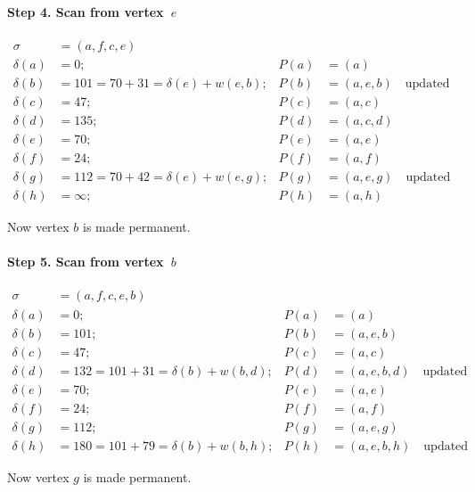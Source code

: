 \documentclass[10pt,]{book}
\theoremstyle{plain}
\theoremstyle{definition}
\theoremstyle{definition}
\theoremstyle{definition}
\theoremstyle{definition}
\numberwithin{equation}{section}
\newcommand{\amp}{&}
\begin{document}
\paragraph[{Step 4.  Scan from vertex~\(e\)}]{Step 4.  Scan from vertex~\(e\)}\hypertarget{paragraphs-4}{}
\hypertarget{p-205}{}%
%
\begin{align*}
\sigma\amp=(a,f,c,e)\\
\delta(a)\amp=0; \amp P(a)\amp=(a)\\
\delta(b)\amp=101=70+31= \delta(e)+w(e,b); \amp P(b)\amp=(a,e,b)\quad\text{updated}\\
\delta(c)\amp=47; \amp P(c)\amp=(a,c)\\
\delta(d)\amp=135; \amp P(d)\amp=(a,c,d)\\
\delta(e)\amp=70; \amp P(e)\amp=(a,e)\\
\delta(f)\amp=24; \amp P(f)\amp=(a,f)\\
\delta(g)\amp=112=70+42= \delta(e)+w(e,g); \amp P(g)\amp=(a,e,g)\quad\text{updated}\\
\delta(h)\amp=\infty; \amp P(h)\amp=(a,h)
\end{align*}
%
\par
\hypertarget{p-206}{}%
Now vertex \(b\) is made permanent.%
\typeout{************************************************}
\typeout{************************************************}
\paragraph[{Step 5.  Scan from vertex~\(b\)}]{Step 5.  Scan from vertex~\(b\)}\hypertarget{paragraphs-5}{}
\hypertarget{p-207}{}%
%
\begin{align*}
\sigma\amp=(a,f,c,e,b)\\
\delta(a)\amp=0; \amp P(a)\amp=(a)\\
\delta(b)\amp=101; \amp P(b)\amp=(a,e,b)\\
\delta(c)\amp=47; \amp P(c)\amp=(a,c)\\
\delta(d)\amp= 132 = 101+ 31= \delta(b)+w(b,d); \amp P(d)\amp=(a,e,b,d)\quad\text{updated} \\
\delta(e)\amp= 70; \amp P(e)\amp=(a,e)\\
\delta(f)\amp= 24; \amp P(f)\amp=(a,f)\\
\delta(g)\amp=112; \amp P(g)\amp=(a,e,g)\\
\delta(h)\amp=180 = 101+79=\delta(b)+w(b,h); \amp P(h)\amp=(a,e,b,h)\quad\text{updated} 
\end{align*}
%
\par
\hypertarget{p-208}{}%
Now vertex \(g\) is made permanent.%
\typeout{************************************************}
\typeout{************************************************}
\end{document}
